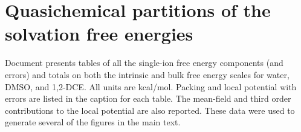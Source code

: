 \chapter{Quasichemical partitions of the solvation free energies~}
\label{chap:a6}


Document presents tables of all the single-ion free energy components (and errors) and totals on both the intrinsic and bulk free energy scales for water, DMSO, 
and 1,2-DCE. All units are kcal/mol. Packing and local potential with errors are listed in the caption for each table. The mean-field and third order contributions 
to the local potential are also reported. These data were used to generate several of the figures in the main text.

